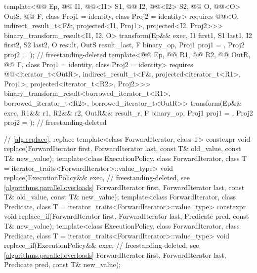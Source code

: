 \begin{codeblock}
{{    template<@@ Ep, @@ I1, @@<I1> S1,
             @@ I2, @@<I2> S2,
             @@ O, @@<O> OutS,
             @@ F, class Proj1 = identity, class Proj2 = identity>
      requires @@<O, indirect_result_t<F&, projected<I1, Proj1>,
                                   projected<I2, Proj2>>>
      binary_transform_result<I1, I2, O>
        transform(Ep&& exec, I1 first1, S1 last1, I2 first2, S2 last2,
                  O result, OutS result_last,
                  F binary_op, Proj1 proj1 = {}, Proj2 proj2 = {});         // freestanding-deleted
    template<@@ Ep, @@ R1, @@ R2,
             @@ OutR, @@ F,
             class Proj1 = identity, class Proj2 = identity>
      requires @@<iterator_t<OutR>,
                                   indirect_result_t<F&, projected<iterator_t<R1>, Proj1>,
                                   projected<iterator_t<R2>, Proj2>>>
      binary_transform_result<borrowed_iterator_t<R1>, borrowed_iterator_t<R2>,
                              borrowed_iterator_t<OutR>>
        transform(Ep&& exec, R1&& r1, R2&& r2, OutR&& result_r,
                  F binary_op, Proj1 proj1 = {}, Proj2 proj2 = {});         // freestanding-deleted
  }

  // \ref{alg.replace}, replace
  template<class ForwardIterator, class T>
    constexpr void replace(ForwardIterator first, ForwardIterator last,
                           const T& old_value, const T& new_value);
  template<class ExecutionPolicy, class ForwardIterator,
           class T = iterator_traits<ForwardIterator>::value_type>
    void replace(ExecutionPolicy&& exec,                        // freestanding-deleted, see \ref{algorithms.parallel.overloads}
                 ForwardIterator first, ForwardIterator last,
                 const T& old_value, const T& new_value);
  template<class ForwardIterator, class Predicate,
           class T = iterator_traits<ForwardIterator>::value_type>
    constexpr void replace_if(ForwardIterator first, ForwardIterator last,
                              Predicate pred, const T& new_value);
  template<class ExecutionPolicy, class ForwardIterator, class Predicate,
           class T = iterator_traits<ForwardIterator>::value_type>
    void replace_if(ExecutionPolicy&& exec,                     // freestanding-deleted, see \ref{algorithms.parallel.overloads}
                    ForwardIterator first, ForwardIterator last,
                    Predicate pred, const T& new_value);

}
\end{codeblock}
